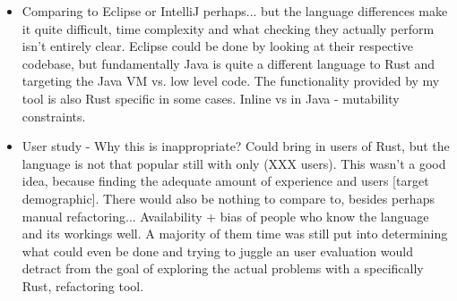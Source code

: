 \begin{itemize}

\item Comparing to Eclipse or IntelliJ perhaps... but the language differences make it quite difficult, time complexity and what checking they actually perform isn't entirely clear. Eclipse could be done by looking at their respective codebase, but fundamentally Java is quite a different language to Rust and targeting the Java VM vs. low level code. The functionality provided by my tool is also Rust specific in some cases. Inline vs in Java - mutability constraints.

\item User study - Why this is inappropriate? Could bring in users of Rust, but the language is not that popular still with only (XXX users). This wasn't a good idea, because finding the adequate amount of experience and users [target demographic]. There would also be nothing to compare to, besides perhaps manual refactoring... Availability + bias of people who know the language and its workings well. A majority of them time was still put into determining what could even be done and trying to juggle an user evaluation would detract from the goal of exploring the actual problems with a specifically Rust, refactoring tool. 

\end{itemize}
